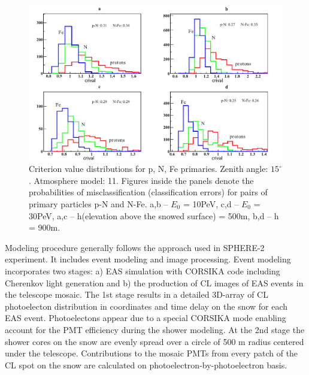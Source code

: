 \documentclass[a4paper]{jpconf}
\begin{document}
\begin{figure}[t]
\centering %
\includegraphics[width=\textwidth]{poster.pdf}
\caption{Criterion value distributions for p, N, Fe primaries. Zenith angle: $15^\circ$. Atmosphere model: 11. Figures inside the panels denote the probabilities of misclassification (classification errors) for pairs of primary particles p-N and N-Fe. \hspace{0.2cm}a,b -- $E_0$ = 10PeV, \hspace{0.2cm}c,d -- $E_0$ = 30PeV, \hspace{0.2cm}a,c -- h(elevation above the snowed surface) = 500m, \hspace{0.2cm}b,d -- h = 900m.}
\label{fig:Modelling}
\end{figure}

Modeling procedure generally follows the approach used in SPHERE-2 experiment. It includes event modeling and image processing.
Event modeling incorporates two stages: a) EAS simulation with CORSIKA code including Cherenkov light generation and b) the production of CL images of EAS events in the telescope mosaic. The 1st stage results in a detailed 3D-array of CL photoelecton distribution in coordinates and time delay on the snow for each EAS event. Photoelectons appear due to a special CORSIKA mode enabling account for the PMT efficiency during the shower modeling. At the 2nd stage the shower cores on the snow are evenly spread over a circle of 500 m radius centered under the telescope. Contributions to the mosaic PMTs from every patch of the CL spot on the snow are calculated on photoelectron-by-photoelectron basis.
\end{document}
